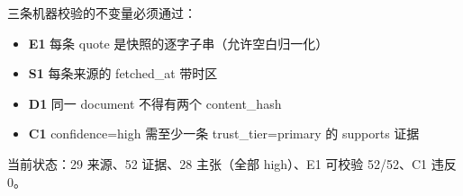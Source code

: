 三条机器校验的不变量必须通过：


\begin{itemize}
  \item \textbf{E1} 每条 quote 是快照的逐字子串（允许空白归一化）
  \item \textbf{S1} 每条来源的 fetched\_at 带时区
  \item \textbf{D1} 同一 document 不得有两个 content\_hash
  \item \textbf{C1} confidence=high 需至少一条 trust\_tier=primary 的 supports 证据
\end{itemize}

当前状态：29 来源、52 证据、28 主张（全部 high）、E1 可校验 52/52、C1 违反 0。

